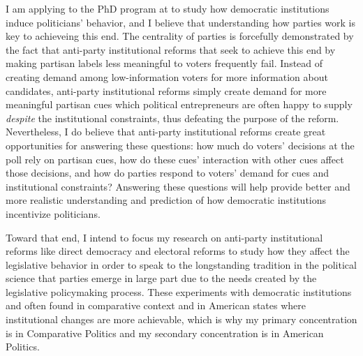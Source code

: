 \documentclass[hyphens, crop=false]{standalone}
\begin{document}
	
	
	
	I am applying to the PhD program at %
	to study how democratic institutions induce politicians' behavior,
	and I believe that understanding how parties work
	is key to achieveing this end.
	The centrality of parties is forcefully
	demonstrated by the fact that anti-party institutional reforms
	that seek to achieve this end 
	by making partisan labels less meaningful to voters
	frequently fail.
	Instead of creating demand among
	low-information voters for more information about candidates,
	anti-party institutional reforms simply create demand for more meaningful partisan cues
	which political entrepreneurs are often happy to supply
	\textit{despite} the institutional constraints,
	thus defeating the purpose of the reform.
	Nevertheless,
	I do believe that anti-party institutional reforms
	create great opportunities for answering
	these questions:
	how much do voters' decisions at the poll rely on partisan cues,
	how do these cues' interaction with other cues affect those decisions,
	and how do parties respond to voters' demand for cues 
	and institutional constraints?
	Answering these questions will help provide better and more realistic
	understanding and prediction of how democratic institutions incentivize politicians.
	
	
	
	Toward that end,
	I intend to focus my research on
	anti-party institutional reforms like
	direct democracy and electoral reforms
	to study how they affect the legislative behavior
	in order
	to speak to the longstanding tradition
	in the political science
	that parties emerge in large part
	due to the needs created by
	the legislative policymaking process.
	These experiments with democratic institutions
	and often found in comparative context
	and in American states
	where institutional changes are more achievable,
	which is why my primary concentration is in
	Comparative Politics
	and my secondary concentration is in
	American Politics.
	
\end{document}
